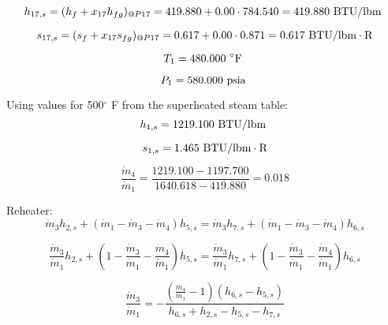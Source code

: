 \documentclass{article}
\begin{document}
\begin{equation}
  h_{17,s} = (h_{f} + x_{17}h_{fg})_{@P17} =  419.880 + 0.00\cdot 784.540 =  419.880
\textnormal{ BTU/lbm                   }
\end{equation}

\begin{equation}
  s_{17,s} = (s_{f} + x_{17}s_{fg})_{@P17} =    0.617 + 0.00\cdot   0.871 =    0.617
\textnormal{ BTU/lbm}\cdot\textnormal{R}
\end{equation}

\begin{equation}
T_{ 1} =  480.000\textnormal{ \(^{\circ}\)F             }
\end{equation}

\begin{equation}
P_{ 1} =  580.000\textnormal{ psia                      }
\end{equation}


Using values for 500\(^{\circ}\) F from the superheated steam table:
\begin{equation}
  h_{ 1,s} = 1219.100\textnormal{ BTU/lbm                   }
\end{equation}

\begin{equation}
  s_{ 1,s} =    1.465\textnormal{ BTU/lbm}\cdot\textnormal{R}
\end{equation}

\begin{equation}
\frac{\dot{m}_{4}}{\dot{m}_{1}} = \frac{1219.100 - 1197.700}{1640.618 -  419.880} =    0.018
\end{equation}


Reheater:
\begin{equation}
\dot{m}_{ 3}h_{ 2,s} + (\dot{m}_{ 1} - \dot{m}_{ 3} - \dot{m}_{ 4})h_{ 5,s} = \dot{m}_{ 3}h_{ 7,s} + (\dot{m}_{ 1} - \dot{m}_{ 3} - \dot{m}_{ 4})h_{ 6,s}
\end{equation}

\begin{equation}
\frac{\dot{m}_{ 3}}{\dot{m}_{ 1}}h_{ 2,s} + (1 - \frac{\dot{m}_{ 3}}{\dot{m}_{ 1}} - \frac{\dot{m}_{ 4}}{\dot{m}_{ 1}})h_{ 5,s} = \frac{\dot{m}_{ 3}}{\dot{m}_{ 1}}h_{ 7,s} + (1 - \frac{\dot{m}_{ 3}}{\dot{m}_{ 1}} - \frac{\dot{m}_{ 4}}{\dot{m}_{ 1}})h_{ 6,s}
\end{equation}

\begin{equation}
\frac{\dot{m}_{3}}{\dot{m}_{1}} = -\frac{(\frac{\dot{m}_{4}}{\dot{m}_{ 1}} - 1)(h_{6,s} - h_{5,s})}{h_{6,s} + h_{2,s} - h_{5,s} - h_{7,s}}
\end{equation}
\end{document}
